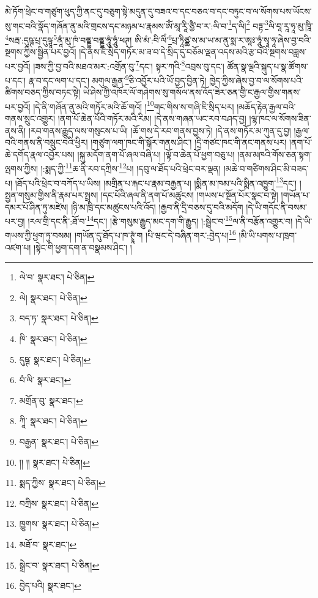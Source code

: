མེ་ཏོག་ཕྲེང་བ་གཙུག་ཕུད་ཀྱི་ནང་དུ་བཅུག་སྟེ་མདུན་དུ་བཟའ་བ་དང་བཅའ་བ་དང་བཏུང་བ་ལ་སོགས་པས་ཡོངས་སུ་གང་བའི་སྣོད་གཞོན་ནུ་མའི་གྲངས་དང་མཉམ་པ་རྣམས་ཨོཾ་མཱ་རཱི་ཙྱཻ་བ་ར་:ལི་བ་\footnote{ལེ་བ་  སྣར་ཐང་།  པེ་ཅིན། }ད་ལི།\footnote{ལེ།  སྣར་ཐང་།  པེ་ཅིན། } བཏྟ་\footnote{བད་ཏ་  སྣར་ཐང་།  པེ་ཅིན། }ལི་བཱ་རཱ་ཧཱ་མུ་ཁཱི་\footnote{ཁི་  སྣར་ཐང་།  པེ་ཅིན། }སརྦ་:དུཥྚ་པྲ་དུཥྚཱ་\footnote{དུཥྚ་  སྣར་ཐང་།  པེ་ཅིན། }ནཱཾ་མུ་ཁཾ་བནྡྷ་བནྡྷ་ཧཱུཾ་ཧཱུཾ་ཕཊ། ཨི་མཾ་:བི་ལིཾ་\footnote{བཾ་ལི་  སྣར་ཐང་། }པྲ་ཏཱིཙྪ་ས་མ་ཡ་མ་ནུ་སྨ་ར་ཨཱཿ་ཧཱུཾ་སྭཱ་ཧཱ་ཞེས་བྱ་བའི་སྔགས་ཀྱིས་སྦྱིན་པར་བྱའོ། །དེ་ནས་ཇི་སྲིད་གཏོར་མ་ཟ་བ་དེ་སྲིད་དུ་བཅོམ་ལྡན་འདས་མའི་རྩ་བའི་སྔགས་བཟླས་པར་བྱའོ། །ཟས་ཀྱི་བྱ་བའི་མཐའ་མར་:འགྲོན་བུ་\footnote{མགྲོན་བུ་  སྣར་ཐང་། }དང་། སྟར་ཀའི་\footnote{ཀཱི་  སྣར་ཐང་།  པེ་ཅིན། }འབྲས་བུ་དང་། ཚོན་སྣ་ལྔའི་སྐུད་པ་སྣ་ཚོགས་པ་དང་། རྣ་བ་དང་ལག་པ་དང་། མགུལ་རྒྱན་\footnote{བརྒྱན་  སྣར་ཐང་།  པེ་ཅིན། }ཅི་འབྱོར་པའི་ཡོ་བྱད་བྱིན་ཏེ། ཁྱེད་ཀྱིས་ཞེས་བྱ་བ་ལ་སོགས་པའི་ཚིགས་བཅད་ཀྱིས་བཏང་སྟེ། ཡེ་ཤེས་ཀྱི་འཁོར་ལོ་གཤེགས་སུ་གསོལ་ནས་འོད་ཟེར་ཅན་གྱི་ང་རྒྱལ་གྱིས་གནས་པར་བྱའོ། །དེ་ནི་གཞོན་ནུ་མའི་གཏོར་མའི་ཆོ་གའོ། །\footnote{།། །།  སྣར་ཐང་།  པེ་ཅིན། }གང་གིས་ས་གཞི་ཇི་སྲིད་པར། །མཆོད་རྟེན་རྒྱལ་བའི་གནས་སྲུང་འགྱུར། །ནག་པོ་ཆེན་པོའི་གཏོར་མའི་རིམ། །དེ་ནས་གཞན་ཡང་རབ་བཤད་བྱ། །ལྷ་ཁང་ལ་སོགས་ཟིན་ནས་ནི། །རབ་གནས་རྒྱུད་ལས་གསུངས་པ་ཡི། །ཆོ་གས་དེ་རབ་གནས་བྱས་ཏེ། །དེ་ནས་གཏོར་མ་ཀུན་དུ་བྱ། །རྒྱལ་བའི་གནས་ནི་བསྲུང་བའི་ཕྱིར། །གཙུག་ལག་ཁང་གི་སྒོར་གནས་ཤིང་། །དྲི་གཙང་ཁང་གི་ནང་གནས་པར། །ནག་པོ་ཆེ་དགོད་རྣལ་འབྱོར་པས། །སྐུ་མདོག་ནག་པོ་ཞལ་བཞི་པ། །ལྟོ་བ་ཆེན་པོ་ཕྱག་བཅུ་པ། །ནམ་མཁའི་གོས་ཅན་སྟག་ལྤགས་ཀྱིས། །:སྨད་ཀྱི་\footnote{སྨད་ཀྱིས་  སྣར་ཐང་།  པེ་ཅིན། }ཆ་ནི་རབ་དཀྲིས་\footnote{བཀྲིས་  སྣར་ཐང་།  པེ་ཅིན། }པ། །དབུ་ལ་ཐོད་པའི་ཕྲེང་བར་ལྡན། །མཆེ་བ་གཙིགས་ཤིང་མི་བཟད་པ། །ཐོད་པའི་ཕྲེང་བ་བཀོད་པ་ཡིས། །མགྲིན་པ་རྐང་པ་རྣམ་བརྒྱན་པ། །སྨིན་མ་ཁམ་པའི་སྨིན་འཁྱུག་\footnote{ཁྱུགས་  སྣར་ཐང་།  པེ་ཅིན། }དང་། །སྤྱན་གསུམ་གྱིས་ནི་རྣམ་པར་སྤྲས། །དང་པོའི་ཞལ་ནི་ནག་པོ་མཚུངས། །གཡས་པ་སྔོན་པོར་སྣང་བ་སྟེ། །གཡོན་པ་དམར་པོ་ཤིན་ཏུ་མཛེས། །ཉི་མ་ཁྲི་དང་མཚུངས་པའི་འོད། །རྒྱབ་ནི་དྲི་བཅས་དུ་བའི་མདོག །དེ་ཡི་གདོང་ནི་བསམ་པར་བྱ། །རལ་གྲི་དང་ནི་:ཐོ་བ་\footnote{མཐོ་བ་  སྣར་ཐང་། }དང་། །རྩེ་གསུམ་རྒྱུད་མང་དག་གི་རྒྱུད། །:སྦྲེང་བ་\footnote{སྒྲེང་བ་  སྣར་ཐང་།  པེ་ཅིན། }ལ་ནི་བརྩོན་འགྱུར་བ། །དེ་ཡི་གཡས་ཀྱི་ཕྱག་ཏུ་བསམ། །གཡོན་དུ་ཐོད་པ་ཁ་ཊྭཱཾ་ག །པི་ཝང་དེ་བཞིན་གར་:བྱེད་པ།\footnote{བྱེད་པའི།  སྣར་ཐང་། } །མི་ཡི་པགས་པ་ཁྲག་འཛག་པ། །སྟེང་གི་ཕྱག་དག་ན་བསྣམས་ཤིང་། །
